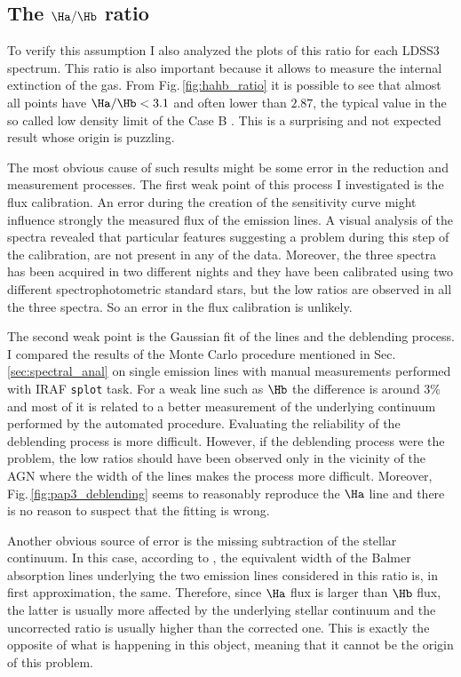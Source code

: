 \subsection{The $\Ha/\Hb$ ratio}
\label{sec:hahb_ratio}

To verify this assumption I also analyzed the plots of this ratio for each LDSS3 spectrum.
This ratio is also important because it allows to measure the internal extinction of the gas.
From Fig.\,\ref{fig:hahb_ratio} it is possible to see that almost all points have $\Ha/\Hb<3.1$ and often lower than $2.87$, the typical value in the so called low density limit of the Case B \citep[][see also Sec.\,\ref{sec:emission_line}]{OsterbrockAGN}.
This is a surprising and not expected result whose origin is puzzling.

The most obvious cause of such results might be some error in the reduction and measurement processes.
The first weak point of this process I investigated is the flux calibration.
An error during the creation of the sensitivity curve might influence strongly the measured flux of the emission lines.
A visual analysis of the spectra revealed that particular features suggesting a problem during this step of the calibration, are not present in any of the data.
Moreover, the three spectra has been acquired in two different nights and they have been calibrated using two different spectrophotometric standard stars, but the low ratios are observed in all the three spectra.
So an error in the flux calibration is unlikely.

The second weak point is the Gaussian fit of the lines and the deblending process.
I compared the results of the Monte Carlo procedure mentioned in Sec.\,\ref{sec:spectral_anal} on single emission lines with manual measurements performed with IRAF \verb!splot! task.
For a weak line such as $\Hb$ the difference is around $3\%$ and most of it is related to a better measurement of the underlying continuum performed by the automated procedure. 
Evaluating the reliability of the deblending process is more difficult. 
However, if the deblending process were the problem, the low ratios should have been observed only in the vicinity of the AGN where the width of the lines makes the process more difficult.
Moreover, Fig.\,\ref{fig:pap3_deblending} seems to reasonably reproduce the $\Ha$ line and there is no reason to suspect that the fitting is wrong.

Another obvious source of error is the missing subtraction of the stellar continuum.
In this case, according to \citet{Groves12}, the equivalent width of the Balmer absorption lines underlying the two emission lines considered in this ratio is, in first approximation, the same.
Therefore, since $\Ha$ flux is larger than $\Hb$ flux, the latter is usually more affected by the underlying stellar continuum and the uncorrected ratio is usually higher than the corrected one.
This is exactly the opposite of what is happening in this object, meaning that it cannot be the origin of this problem.


